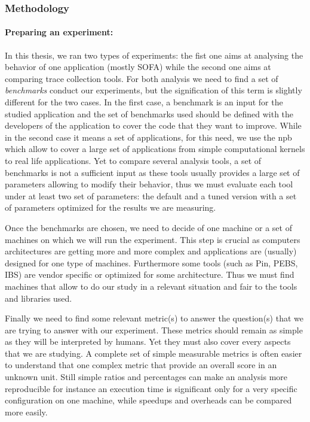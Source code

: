 \subsubsection{Methodology}

\paragraph{Preparing an experiment:}

In this thesis, we ran two types of experiments: the fist one aims at
analysing the behavior of one application (mostly \gls{SOFA}) while the second
one aims at comparing trace collection tools. For both analysis we need to
find a set of \emph{benchmarks} conduct our experiments, but the signification
of this term is slightly different for the two cases. In the first case, a
benchmark is an input for the studied application and the set of benchmarks
used should be defined with the developers of the application to cover the
code that they want to improve. While in the second case it means a set of
applications, for this need, we use the \gls{npb}~\cite{Jin1999} which allow
to cover a large set of applications from simple computational kernels to real
life applications. Yet to compare several analysis tools, a set of benchmarks
is not a sufficient input as these tools usually provides a large set of
parameters allowing to modify their behavior, thus we must evaluate each tool
under at least two set of parameters: the default and a tuned version with a
set of parameters optimized for the results we are measuring.

Once the benchmarks are chosen, we need to decide of one machine or a set of
machines on which we will run the experiment. This step is crucial as
computers architectures are getting more and more complex  and applications are (usually) designed for one type of machines.
Furthermore some tools (such as \gls{Pin}, \gls{PEBS}, \gls{IBS}) are vendor
specific or optimized for some architecture. Thus we must find machines that
allow to do our study in a relevant situation and fair to the tools and
libraries used.

Finally we need to find some relevant metric(s) to answer the question(s) that we
are trying to answer with our experiment. These metrics should remain as
simple as they will be interpreted by humans. Yet they must also cover every
aspects that we are studying. A complete set of simple measurable metrics is
often easier to understand that one complex metric that provide an overall
score in an unknown unit. Still simple ratios and percentages can make an
analysis more reproducible for instance an execution time is significant only
for a very specific configuration on one machine, while speedups and overheads
can be compared more easily.


